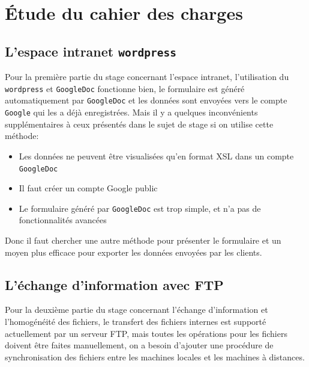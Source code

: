 
\section{Étude du cahier des charges}
\label{CDC}
\subsection{L’espace intranet \texttt{wordpress}}
Pour la première partie du stage concernant l’espace intranet, l’utilisation du \texttt{wordpress} et \texttt{GoogleDoc} fonctionne bien, le formulaire est généré automatiquement par \texttt{GoogleDoc} et les données sont envoyées vers le compte \texttt{Google} qui les a déjà enregistrées. Mais il y a quelques inconvénients supplémentaires à ceux présentés dans le sujet de stage si on utilise cette méthode:\\

\begin{itemize} 
\item Les données ne peuvent être visualisées qu'en format XSL dans un compte \texttt{GoogleDoc}
\item Il faut créer un compte Google public 
\item Le formulaire généré par \texttt{GoogleDoc} est trop simple, et n'a pas de fonctionnalités avancées \\
\end{itemize}

Donc il faut chercher une autre méthode pour présenter le formulaire et un moyen plus efficace pour exporter les données envoyées par les clients.  

\subsection{L’échange d’information avec FTP}

Pour la deuxième partie du stage concernant l’échange d’information et l'homogénéité des fichiers, le transfert des fichiers internes est supporté actuellement par un serveur FTP, mais toutes les opérations pour les fichiers doivent être faites manuellement, on a besoin d'ajouter une procédure de synchronisation des fichiers entre les machines locales et les machines à distances.\\

